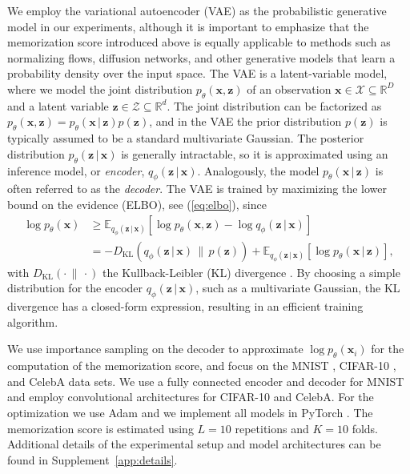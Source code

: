 \documentclass{article}
\newcommand{\bft}[1]{\mathbf{#1}}
\newcommand{\given}{\,|\,}
\begin{document}
We employ the variational autoencoder (VAE) 
\cite{kingma2014auto,rezende2014stochastic} as the probabilistic generative 
model in our experiments, although it is important to emphasize that the 
memorization score introduced above is equally applicable to methods such as 
normalizing flows, diffusion networks, and other generative models that learn 
a probability density over the input space. The VAE is a latent-variable 
model, where we model the joint distribution $p_{\theta}(\bft{x}, \bft{z})$ of 
an observation $\bft{x} \in \mathcal{X} \subseteq \mathbb{R}^D$ and a latent 
variable $\bft{z} \in \mathcal{Z} \subseteq \mathbb{R}^{d}$. The joint 
distribution can be factorized as $p_{\theta}(\bft{x}, \bft{z}) = 
p_{\theta}(\bft{x} \given \bft{z}) p(\bft{z})$, and in the VAE the prior 
distribution $p(\bft{z})$ is typically assumed to be a standard multivariate 
Gaussian. The posterior distribution $p_{\theta}(\bft{z} \given \bft{x})$ is 
generally intractable, so it is approximated using an inference model, or 
\emph{encoder}, $q_{\phi}(\bft{z} \given \bft{x})$. Analogously, the model 
$p_{\theta}(\bft{x} \given \bft{z})$ is often referred to as the 
\emph{decoder}. The VAE is trained by maximizing the lower bound on the 
evidence (ELBO), see (\ref{eq:elbo}), since
\begin{align}
	\log p_{\theta}(\bft{x}) &\geq \mathbb{E}_{q_{\phi}(\bft{z} \given 
		\bft{x})} \left[ \log p_{\theta}(\bft{x}, \bft{z}) - \log 
		q_{\phi}(\bft{z} \given \bft{x}) \right] \\
	&= - D_{\text{KL}}(q_{\phi}(\bft{z} \given \bft{x}) \,\|\, p(\bft{z})) 
	+ \mathbb{E}_{q_{\phi}(\bft{z} \given \bft{x})}\left[ \log 
		p_{\theta}(\bft{x} \given \bft{z}) \right] \label{eq:elbo},
\end{align}
with $D_{\text{KL}}(\cdot \,\|\, \cdot)$ the Kullback-Leibler (KL) divergence 
\cite{kullback1951information}. By choosing a simple distribution for the 
encoder $q_{\phi}(\bft{z} \given \bft{x})$, such as a multivariate Gaussian, 
the KL divergence has a closed-form expression, resulting in an efficient 
training algorithm.

We use importance sampling on the decoder \cite{burda2016importance} to 
approximate $\log p_{\theta}(\bft{x}_i)$ for the computation of the 
memorization score, and focus on the MNIST \cite{lecun1998mnist}, CIFAR-10 
\cite{krizhevsky2009learning}, and CelebA \cite{liu2015faceattributes} data 
sets. We use a fully connected encoder and decoder for MNIST and employ 
convolutional architectures for CIFAR-10 and CelebA. For the optimization we 
use Adam \cite{kingma2015adam} and we implement all models in PyTorch 
\cite{paszke2019pytorch}. The memorization score is estimated using $L = 10$ 
repetitions and $K = 10$ folds. Additional details of the experimental setup 
and model architectures can be found in Supplement~\ref{app:details}.
\end{document}
